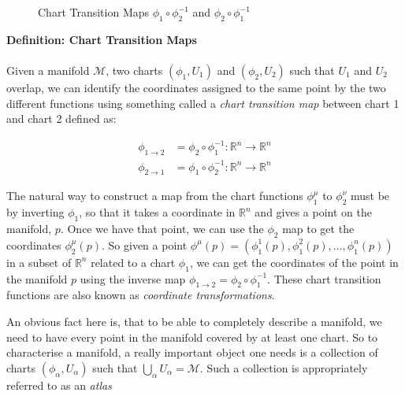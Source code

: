 \documentclass[10pt]{article}
\begin{document}
\begin{figure}[h!]
\centering

\caption{Chart Transition Maps $\phi_1\circ\phi_2^{-1}$ and $\phi_2\circ\phi_1^{-1}$}
\label{fig:my_label 3}
\end{figure}

\begin{tcolorbox}
\textbf{Definition: Chart Transition Maps} \\ \\ 
Given a manifold $\mathcal{M}$, two charts $(\phi_1,U_1)$ and $(\phi_2,U_2)$ such that $U_1$ and $U_2$ overlap, we can identify the coordinates assigned to the same point by the two different functions using something called a \textit{chart transition map} between chart 1 and chart 2 defined as:

\begin{align*}
    \phi_{1\rightarrow 2} &= \phi_2\circ\phi_1^{-1} : \mathbb{R}^n \rightarrow \mathbb{R}^n \\
    \phi_{2\rightarrow 1} &= \phi_1\circ\phi_2^{-1} : \mathbb{R}^n \rightarrow \mathbb{R}^n
\end{align*}

\end{tcolorbox}

The natural way to construct a map from the chart functions $\phi_1^{\mu}$ to $\phi_2^{\nu}$ must be by inverting $\phi_1$, so that it takes a coordinate in $\mathbb{R}^n$ and gives a point on the manifold, $p$. Once we have that point, we can use the $\phi_2$ map to get the coordinates $\phi_2^{\mu}(p)$. So given a point $\phi^{\mu}(p) = (\phi^{1}_1(p),\phi^{2}_1(p),...,\phi^{n}_1(p))$ in a subset of $\mathbb{R}^n$ related to a chart $\phi_1$, we can get the coordinates of the point in the manifold $p$ using the inverse map $\phi_{1\rightarrow 2} = \phi_2\circ\phi_1^{-1}$. These chart transition functions are also known as \textit{coordinate transformations}.

An obvious fact here is, that to be able to completely describe a manifold, we need to have every point in the manifold covered by at least one chart. So to characterise a manifold, a really important object one needs is a collection of charts $(\phi_{\alpha},U_{\alpha})$ such that $\bigcup_{\alpha} U_{\alpha} = \mathcal{M}$. Such a collection is appropriately referred to as an \textit{atlas} \\
\end{document}
